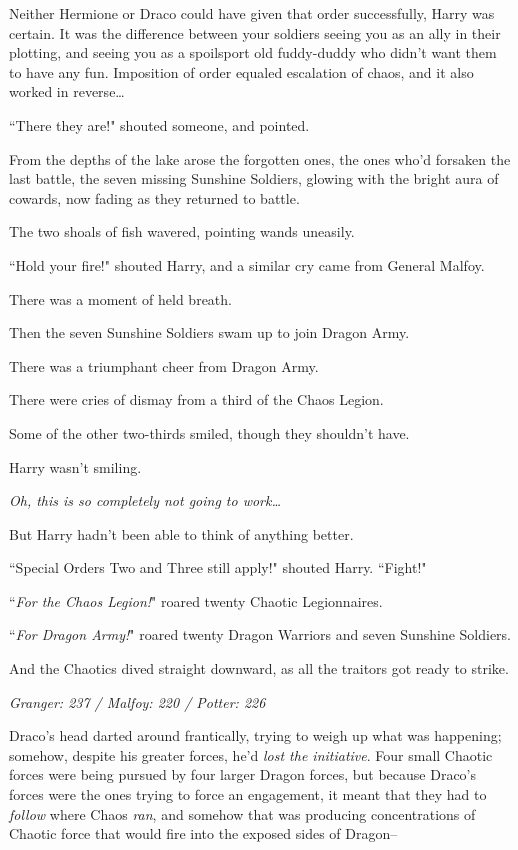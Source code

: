 Neither Hermione or Draco could have given that order successfully, Harry was certain. It was the difference between your soldiers seeing you as an ally in their plotting, and seeing you as a spoilsport old fuddy-duddy who didn't want them to have any fun. Imposition of order equaled escalation of chaos, and it also worked in reverse{\ldots}

``There they are!" shouted someone, and pointed.

From the depths of the lake arose the forgotten ones, the ones who'd forsaken the last battle, the seven missing Sunshine Soldiers, glowing with the bright aura of cowards, now fading as they returned to battle.

The two shoals of fish wavered, pointing wands uneasily.

``Hold your fire!" shouted Harry, and a similar cry came from General Malfoy.

There was a moment of held breath.

Then the seven Sunshine Soldiers swam up to join Dragon Army.

There was a triumphant cheer from Dragon Army.

There were cries of dismay from a third of the Chaos Legion.

Some of the other two-thirds smiled, though they shouldn't have.

Harry wasn't smiling.

\emph{Oh, this is so completely not going to work{\ldots}}

But Harry hadn't been able to think of anything better.

``Special Orders Two and Three still apply!" shouted Harry. ``Fight!"

``\emph{For the Chaos Legion!}" roared twenty Chaotic Legionnaires.

``\emph{For Dragon Army!}" roared twenty Dragon Warriors and seven Sunshine Soldiers.

And the Chaotics dived straight downward, as all the traitors got ready to strike.

\later

\emph{Granger: 237 / Malfoy: 220 / Potter: 226}

Draco's head darted around frantically, trying to weigh up what was happening; somehow, despite his greater forces, he'd \emph{lost the initiative}. Four small Chaotic forces were being pursued by four larger Dragon forces, but because Draco's forces were the ones trying to force an engagement, it meant that they had to \emph{follow} where Chaos \emph{ran}, and somehow that was producing concentrations of Chaotic force that would fire into the exposed sides of Dragon\---


